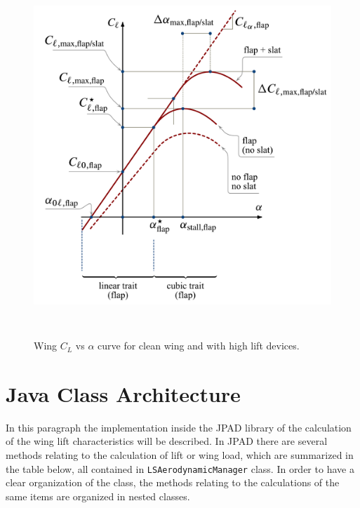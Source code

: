 \begin{figure}[H]
\centering
{\includegraphics[height=12.9cm]{Immagini/Airfoil_Cl_Vs_alpha_curve_flap_slat.pdf}} 
\caption{Wing $C_L$ vs $\alpha$ curve for clean wing and with high lift devices.}
\label{fig:clalfahl}
\end{figure}


\section{Java Class Architecture}

In this paragraph the implementation inside the JPAD library of the calculation of the wing lift characteristics will be described. In JPAD there are several methods relating to the calculation of lift or wing load, which are summarized in the table below, all contained in \texttt{LSAerodynamicManager} class. In order to have a clear organization of the class, the methods relating to the calculations of the same items are organized in nested classes.

